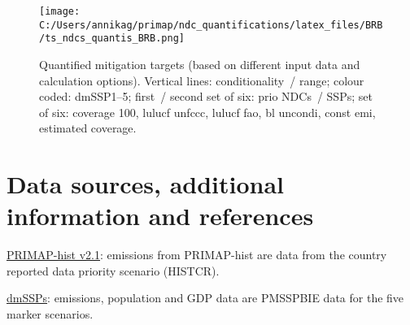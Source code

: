\documentclass[12pt]{article}
\begin{document}
 \begin{figure}[H]
 \centering
 \texttt{[image: C:/Users/annikag/primap/ndc\_quantifications/latex\_files/BRB/ts\_ndcs\_quantis\_BRB.png]}
 \caption{Quantified mitigation targets (based on different input data and calculation options).
 Vertical lines: conditionality~/ range;
 colour coded: dmSSP1--5;
 first~/ second set of six: prio NDCs~/ SSPs;
 set of six: coverage 100, lulucf unfccc, lulucf fao, bl uncondi, const emi, estimated coverage.}
 \label{fig:miti}
 \end{figure}

 \newpage %
 \section{Data sources, additional information and references}
 \label{sec:dataSourcesRefs}

 \noindent \href{https://dataservices.gfz-potsdam.de/pik/showshort.php?id=escidoc:4736895}{PRIMAP-hist v2.1}: emissions from PRIMAP-hist are data from the country reported data priority scenario (HISTCR).

 \noindent \href{https://zenodo.org/record/3638137#.X2syXouxU2w}{dmSSPs}: emissions, population and GDP data are PMSSPBIE data for the five marker scenarios.
\end{document}
